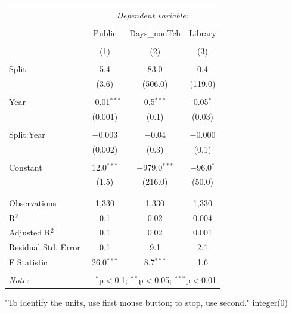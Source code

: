 \documentclass[12pt, a4paper]{article}
\begin{document}
\begin{table}[!htbp] \centering 
  \caption{} 
  \label{} 
\begin{tabular}{@{\extracolsep{5pt}}lccc} 
\\[-1.8ex]\hline 
\hline \\[-1.8ex] 
 & \multicolumn{3}{c}{\textit{Dependent variable:}} \\ 
\cline{2-4} 
\\[-1.8ex] & Public & Days\_nonTch & Library \\ 
\\[-1.8ex] & (1) & (2) & (3)\\ 
\hline \\[-1.8ex] 
 Split & 5.4 & 83.0 & 0.4 \\ 
  & (3.6) & (506.0) & (119.0) \\ 
  & & & \\ 
 Year & $-$0.01$^{***}$ & 0.5$^{***}$ & 0.05$^{*}$ \\ 
  & (0.001) & (0.1) & (0.03) \\ 
  & & & \\ 
 Split:Year & $-$0.003 & $-$0.04 & $-$0.000 \\ 
  & (0.002) & (0.3) & (0.1) \\ 
  & & & \\ 
 Constant & 12.0$^{***}$ & $-$979.0$^{***}$ & $-$96.0$^{*}$ \\ 
  & (1.5) & (216.0) & (50.0) \\ 
  & & & \\ 
\hline \\[-1.8ex] 
Observations & 1,330 & 1,330 & 1,330 \\ 
R$^{2}$ & 0.1 & 0.02 & 0.004 \\ 
Adjusted R$^{2}$ & 0.1 & 0.02 & 0.001 \\ 
Residual Std. Error & 0.1 & 9.1 & 2.1 \\ 
F Statistic & 26.0$^{***}$ & 8.7$^{***}$ & 1.6 \\ 
\hline 
\hline \\[-1.8ex] 
\textit{Note:}  & \multicolumn{3}{r}{$^{*}$p$<$0.1; $^{**}$p$<$0.05; $^{***}$p$<$0.01} \\ 
\end{tabular} 
\end{table} \clearpage
\begin{Schunk}
\begin{Soutput}
[1] "To identify the units, use first mouse button; to stop, use second."
integer(0)
\end{Soutput}
\end{Schunk}
\end{document}
